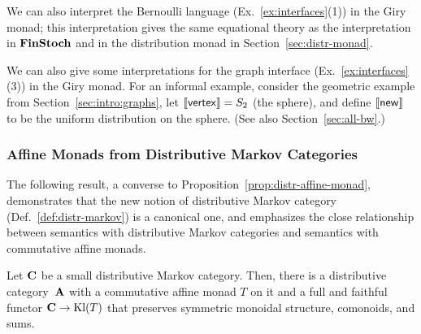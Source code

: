 We can also interpret the Bernoulli language (Ex.~\ref{ex:interfaces}(1)) in the Giry monad; this interpretation gives the same equational theory as the interpretation in $\mathbf{FinStoch}$ and in the distribution monad in Section~\ref{sec:distr-monad}.

    We can also give some interpretations for the graph interface
    (Ex.~\ref{ex:interfaces}(3)) in the Giry monad.
    For an informal example, consider the geometric example from Section~\ref{sec:intro:graphs}, let $\llbracket \mathsf{vertex}\rrbracket=S_2$ (the sphere), and define $\llbracket \mathsf{new}\rrbracket$ to be the uniform distribution on the sphere.
    (See also Section~\ref{sec:all-bw}.) 

    \subsubsection{Affine Monads from Distributive Markov Categories}\label{sec:dmc-to-am}
    The following result, a converse to Proposition~\ref{prop:distr-affine-monad}, demonstrates that the new notion of distributive Markov category (Def.~\ref{def:distr-markov}) is a canonical one, and emphasizes the close relationship between semantics with distributive Markov categories and semantics with commutative affine monads. 
\begin{proposition}\label{prop:markov-embed-kleisli}
  Let $\mathbf{C}$ be a small distributive Markov category.
  Then, there is a distributive category~$\mathbf{A}$ with a commutative affine monad $T$ on it
  and a full and faithful functor $\mathbf{C}\to \mathrm{Kl}(T)$ that preserves
  symmetric monoidal structure, comonoids, and sums.
\end{proposition}
